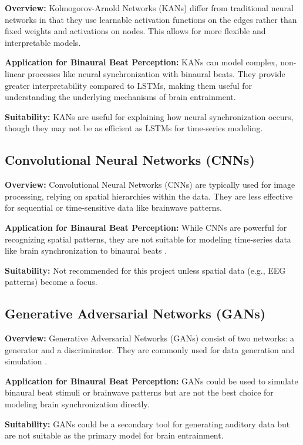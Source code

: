 \documentclass{article}
\begin{document}
\textbf{Overview:} Kolmogorov-Arnold Networks (KANs) differ from traditional neural networks in that they use learnable activation functions on the edges rather than fixed weights and activations on nodes. This allows for more flexible and interpretable models.

\textbf{Application for Binaural Beat Perception:} KANs can model complex, non-linear processes like neural synchronization with binaural beats. They provide greater interpretability compared to LSTMs, making them useful for understanding the underlying mechanisms of brain entrainment.

\textbf{Suitability:} KANs are useful for explaining how neural synchronization occurs, though they may not be as efficient as LSTMs for time-series modeling.

\subsection{Convolutional Neural Networks (CNNs)}

\textbf{Overview:} Convolutional Neural Networks (CNNs) are typically used for image processing, relying on spatial hierarchies within the data. They are less effective for sequential or time-sensitive data like brainwave patterns.

\textbf{Application for Binaural Beat Perception:} While CNNs are powerful for recognizing spatial patterns, they are not suitable for modeling time-series data like brain synchronization to binaural beats \cite{lecun1998gradient}.

\textbf{Suitability:} Not recommended for this project unless spatial data (e.g., EEG patterns) become a focus.

\subsection{Generative Adversarial Networks (GANs)}

\textbf{Overview:} Generative Adversarial Networks (GANs) consist of two networks: a generator and a discriminator. They are commonly used for data generation and simulation \cite{goodfellow2014generative}.

\textbf{Application for Binaural Beat Perception:} GANs could be used to simulate binaural beat stimuli or brainwave patterns but are not the best choice for modeling brain synchronization directly.

\textbf{Suitability:} GANs could be a secondary tool for generating auditory data but are not suitable as the primary model for brain entrainment.
\end{document}
